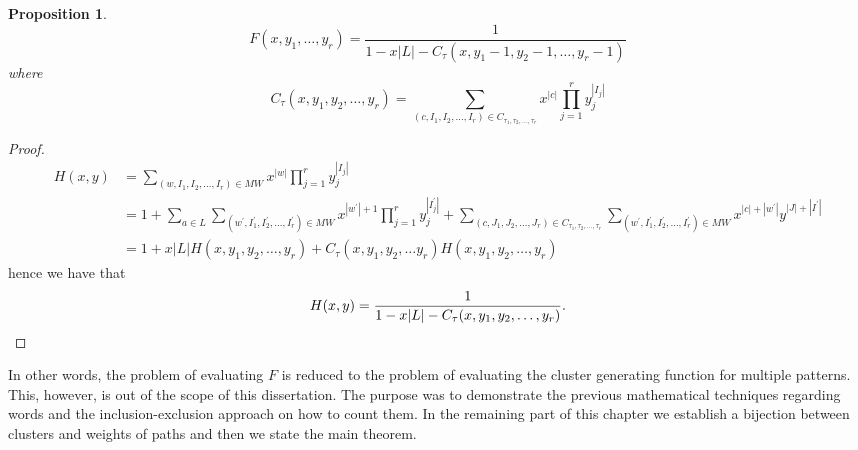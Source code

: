 \documentclass[12pt]{report}
\newtheorem{prop}{Proposition}
\begin{document}
{{\begin{prop}
\[ F(x,y_1,\ldots,y_r) = \frac{1}{1 - x |L| - C_\tau(x,y_1-1, y_2-1,\ldots, y_r-1)} \]
where 
\[ C_\tau (x,y_1, y_2, \ldots, y_r) = \sum\limits_{(c,I_1, I_2, \ldots, I_r) \in C_{\tau_1, \tau_2, \ldots, \tau_r}} x^{|c|} \prod\limits_{j=1}^r y_j^{|I_j|} \]
\end{prop}

\begin{proof}
\begin{align*}
H(x,y) 
& = \sum\limits_{(w, I_1, I_2, \ldots, I_r) \in MW} x^{|w|} \prod\limits_{j=1}^r y_j^{|I_j|} \\
& = 1 + \sum\limits_{a \in L} \sum\limits_{(w^\prime, I_1^\prime, I_2^\prime, \ldots, I_r^\prime) \in MW} x^{|w^\prime| + 1} \prod\limits_{j=1}^r y_j^{|I_j^\prime|} + \sum\limits_{(c, J_1, J_2, \ldots, J_r) \in C_{\tau_1, \tau_2, \ldots, \tau_r}} \sum\limits_{(w^\prime, I_1^\prime, I_2^\prime, \ldots, I_r^\prime) \in MW} x^{|c| + |w^\prime|} y^{|J| + |I^\prime|} \\
& =  1 + x |L| H(x,y_1, y_2, \ldots, y_r) + C_\tau(x,y_1, y_2, \ldots y_r) H(x,y_1, y_2, \ldots, y_r)  
\end{align*}
hence we have that
\[ H(x,y) = \frac{1}{1 - x |L| - C_\tau(x,y_1, y_2,\ldots, y_r)}. \qedhere \]
\end{proof}

\noindent In other words, the problem of evaluating $F$ is reduced to the problem of evaluating the cluster generating function for multiple patterns. This, however, is out of the scope of this dissertation. The purpose was to demonstrate the previous mathematical techniques regarding words and the inclusion-exclusion approach on how to count them. In the remaining part of this chapter we establish a bijection between clusters and weights of paths and then we state the main theorem.

\begin{comment}
In order to do this, the following notations are given:

\begin{enumerate}[label=\roman{*})]
\item For any set of patterns $T=\{\tau_1,\tau_2,\ldots,\tau_r\}$ a $(1\times r)$-vector is defined as $\overline{T}=[x^{|\tau_1|},x^{|\tau_2|},\ldots,x^{|\tau_r|}] $ where $x \in R$, $x$ is an indeterminate which counts the length of the corresponding pattern and $(R,+,\cdot)$ is a commutative ring. The vector $\overline{T} $ is called the {\em generating vector} of $T$.


\end{comment}}}
\end{document}
